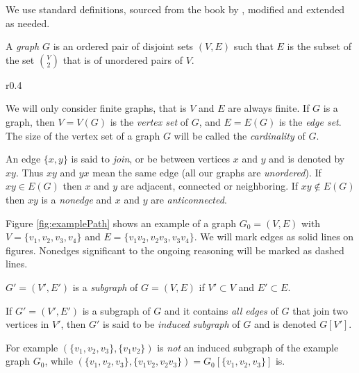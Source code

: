 We use standard definitions, sourced from the book by \citeauthor{BB98} , modified and extended as needed.

\begin{defn}[graph]
  A \emph{graph} $G$ is an ordered pair of disjoint sets $(V, E)$ such that $E$ is the subset of the set $V \choose 2$ that is of unordered pairs of $V$.
\end{defn}

\begin{wrapfigure}{r}{0.4\textwidth}
  \label{fig:examplePath}
  \centering{}
  \caption{An example graph $G_0$}
\end{wrapfigure}

We will only consider finite graphs, that is $V$ and $E$ are always finite. If $G$ is a graph, then $V = V(G)$ is the \emph{vertex set} of $G$, and $E = E(G)$ is the \emph{edge set}. The size of the vertex set of a graph $G$ will be called the \emph{cardinality} of $G$.

An edge $\{x, y\}$ is said to \emph{join}, or be between vertices $x$ and $y$ and is denoted by $xy$. Thus $xy$ and $yx$ mean the same edge (all our graphs are \emph{unordered}). If $xy \in E(G)$ then $x$ and $y$ are adjacent, connected or neighboring. If $xy \notin E(G)$ then $xy$ is a \emph{nonedge} and $x$ and $y$ are \emph{anticonnected}.

Figure \ref{fig:examplePath} shows an example of a graph $G_0 = (V, E)$ with $V = \{v_1, v_2, v_3, v_4\}$ and $E = \{v_1v_2, v_2v_3, v_3v_4\}$. We will mark edges as solid lines on figures. Nonedges significant to the ongoing reasoning will be marked as dashed lines.

\begin{defn}[subgraph]
  $G' = (V', E')$ is a \emph{subgraph} of $G = (V, E)$ if $V' \subset V$ and $E' \subset E$.
\end{defn}

\begin{defn}
  If $G' = (V', E')$ is a subgraph of $G$ and it contains \emph{all edges} of $G$ that join two vertices in $V'$, then $G'$ is said to be \emph{induced subgraph} of $G$ and is denoted $G[V']$.
\end{defn}
For example $(\{v_1, v_2, v_3\}, \{v_1v_2\})$ is \emph{not} an induced subgraph of the example graph $G_0$, while $(\{v_1, v_2, v_3\}, \{v_1v_2, v_2v_3\}) = G_0[\{v_1, v_2, v_3\}]$ is.

